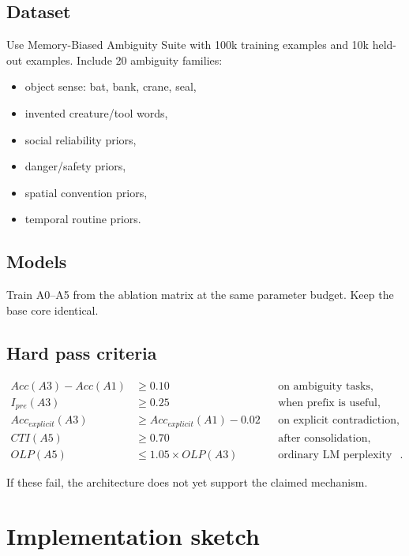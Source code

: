 \documentclass[11pt]{article}
\begin{document}
\subsection{Dataset}

Use Memory-Biased Ambiguity Suite with 100k training examples and 10k held-out examples. Include 20 ambiguity families:
\begin{itemize}
    \item object sense: bat, bank, crane, seal,
    \item invented creature/tool words,
    \item social reliability priors,
    \item danger/safety priors,
    \item spatial convention priors,
    \item temporal routine priors.
\end{itemize}

\subsection{Models}

Train A0--A5 from the ablation matrix at the same parameter budget. Keep the base core identical.

\subsection{Hard pass criteria}

\begin{align}
    Acc(A3)-Acc(A1)&\ge 0.10 && \text{on ambiguity tasks},\\
    I_{pre}(A3)&\ge 0.25 && \text{when prefix is useful},\\
    Acc_{explicit}(A3)&\ge Acc_{explicit}(A1)-0.02 && \text{on explicit contradiction},\\
    CTI(A5)&\ge 0.70 && \text{after consolidation},\\
    OLP(A5)&\le 1.05\times OLP(A3) && \text{ordinary LM perplexity drift}.
\end{align}

If these fail, the architecture does not yet support the claimed mechanism.

\section{Implementation sketch}
\end{document}
